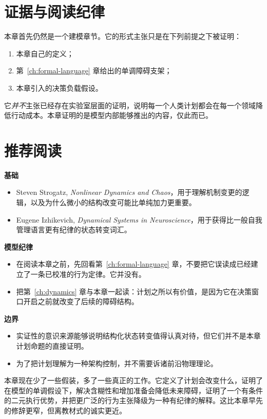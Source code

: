 \section{证据与阅读纪律}

本章首先仍然是一个建模章节。它的形式主张只是在下列前提之下被证明：
\begin{enumerate}[nosep]
  \item 本章自己的定义；
  \item 第~\ref{ch:formal-language} 章给出的单调障碍支架；
  \item 本章引入的决策负载假设。
\end{enumerate}

它\emph{并不}主张已经存在实验室层面的证明，说明每一个人类计划都会在每一个领域降低行动成本。本章证明的是模型内部能够推出的内容，仅此而已。

\section{推荐阅读}

\begin{readingbox}
\textbf{基础}
\begin{itemize}[nosep]
  \item Steven Strogatz, \emph{Nonlinear Dynamics and Chaos}，用于理解机制变更的逻辑，以及为什么微小的结构改变可能比单纯加力更重要。
  \item Eugene Izhikevich, \emph{Dynamical Systems in Neuroscience}，用于获得比一般自我管理语言更有纪律的状态转变词汇。
\end{itemize}
\textbf{模型纪律}
\begin{itemize}[nosep]
  \item 在阅读本章之前，先回看第~\ref{ch:formal-language} 章，不要把它误读成已经建立了一条已校准的行为定律。它并没有。
  \item 把第~\ref{ch:dynamics} 章与本章一起读：计划之所以有价值，是因为它在决策窗口开启之前就改变了后续的障碍结构。
\end{itemize}
\textbf{边界}
\begin{itemize}[nosep]
  \item 实证性的意识来源能够说明结构化状态转变值得认真对待，但它们并不是本章计划命题的直接证明。
  \item 为了把计划理解为一种架构控制，并不需要诉诸前沿物理理论。
\end{itemize}
\end{readingbox}

\begin{summarybox}
本章现在少了一些假装，多了一些真正的工作。它定义了计划会改变什么，证明了在模型的单调假设下，解决含糊性和增加准备会降低未来障碍，证明了一个有条件的二元执行优势，并把更广泛的行为主张降级为一种有纪律的解释。这比本章早先的修辞更窄，但离教材式的诚实更近。
\end{summarybox}
